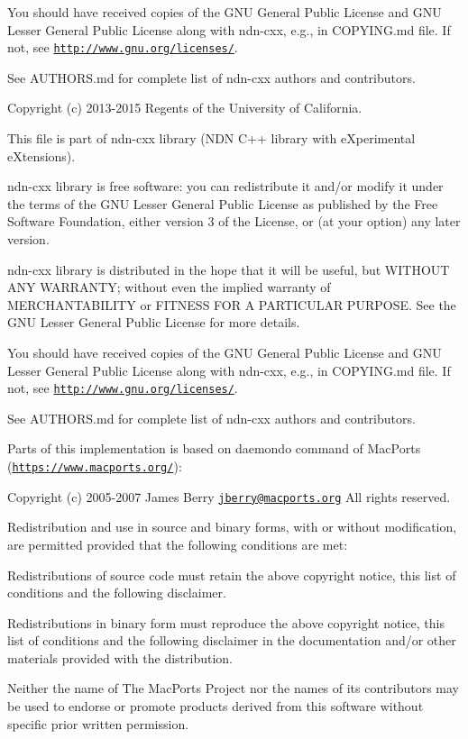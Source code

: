You should have received copies of the G\+NU General Public License and G\+NU Lesser General Public License along with ndn-\/cxx, e.\+g., in C\+O\+P\+Y\+I\+N\+G.\+md file. If not, see \href{http://www.gnu.org/licenses/}{\tt http\+://www.\+gnu.\+org/licenses/}.

See A\+U\+T\+H\+O\+R\+S.\+md for complete list of ndn-\/cxx authors and contributors.

Copyright (c) 2013-\/2015 Regents of the University of California.

This file is part of ndn-\/cxx library (N\+DN C++ library with e\+Xperimental e\+Xtensions).

ndn-\/cxx library is free software\+: you can redistribute it and/or modify it under the terms of the G\+NU Lesser General Public License as published by the Free Software Foundation, either version 3 of the License, or (at your option) any later version.

ndn-\/cxx library is distributed in the hope that it will be useful, but W\+I\+T\+H\+O\+UT A\+NY W\+A\+R\+R\+A\+N\+TY; without even the implied warranty of M\+E\+R\+C\+H\+A\+N\+T\+A\+B\+I\+L\+I\+TY or F\+I\+T\+N\+E\+SS F\+OR A P\+A\+R\+T\+I\+C\+U\+L\+AR P\+U\+R\+P\+O\+SE. See the G\+NU Lesser General Public License for more details.

You should have received copies of the G\+NU General Public License and G\+NU Lesser General Public License along with ndn-\/cxx, e.\+g., in C\+O\+P\+Y\+I\+N\+G.\+md file. If not, see \href{http://www.gnu.org/licenses/}{\tt http\+://www.\+gnu.\+org/licenses/}.

See A\+U\+T\+H\+O\+R\+S.\+md for complete list of ndn-\/cxx authors and contributors.

Parts of this implementation is based on daemondo command of Mac\+Ports (\href{https://www.macports.org/}{\tt https\+://www.\+macports.\+org/})\+:

Copyright (c) 2005-\/2007 James Berry \href{mailto:jberry@macports.org}{\tt jberry@macports.\+org} All rights reserved.

Redistribution and use in source and binary forms, with or without modification, are permitted provided that the following conditions are met\+:
\begin{DoxyEnumerate}
\item Redistributions of source code must retain the above copyright notice, this list of conditions and the following disclaimer.
\item Redistributions in binary form must reproduce the above copyright notice, this list of conditions and the following disclaimer in the documentation and/or other materials provided with the distribution.
\item Neither the name of The Mac\+Ports Project nor the names of its contributors may be used to endorse or promote products derived from this software without specific prior written permission.
\end{DoxyEnumerate}

